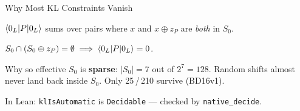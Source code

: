 \documentclass[aspectratio=169,t]{beamer}
\newcommand{\code}[1]{\texttt{\small #1}}
\begin{document}
\begin{frame}{Why Most KL Constraints Vanish}

$\braket{0_L|P|0_L}$ sums over pairs where
$x$ and $x \oplus z_P$ are \emph{both} in $S_0$.

\begin{center}
\end{center}

\vspace{-0.5em}
$S_0 \cap (S_0 \oplus z_P) = \emptyset
  \;\Longrightarrow\; \braket{0_L|P|0_L} = 0$.

\begin{exampleblock}{Why so effective}
$S_0$ is \textbf{sparse}: $|S_0| = 7$ out of $2^7 = 128$.
Random shifts almost never land back inside $S_0$.\;
Only \alert{25}\,/\,210 survive (BD16v1).
\end{exampleblock}

In Lean: \code{klIsAutomatic} is \code{Decidable} --- checked by \code{native\_decide}.
\end{frame}
\end{document}
